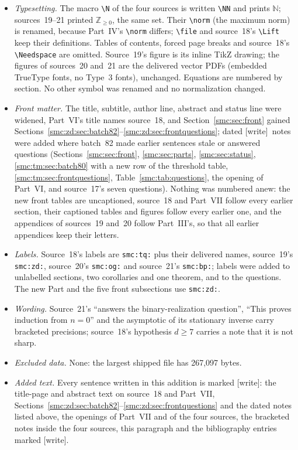 \documentclass[11pt,letterpaper]{article}
\numberwithin{equation}{section}
\theoremstyle{definition}
\theoremstyle{remark}
\newcommand{\N}{\mathbb N_0}
\newcommand{\NN}{\mathbb N}
\newcommand{\wtag}{\textup{[write]}}
\newcommand{\norm}[1]{\mathcal N(#1)}
\newcommand{\Lift}{\mathcal L}\newcommand{\inorm}[1]{\lVert#1\rVert_\infty}
\newcommand{\file}[1]{\texttt{\detokenize{#1}}}
\begin{document}
\begin{itemize}
\item \emph{Typesetting.} The macro \verb|\N| of the four sources is written \verb|\NN| and prints $\NN$; sources~19--21 printed $\mathbb Z_{\ge0}$, the same set. Their \verb|\norm| (the maximum norm) is renamed, because Part~IV's \verb|\norm| differs; \verb|\file| and source~18's \verb|\Lift| keep their definitions. Tables of contents, forced page breaks and source~18's \verb|\Needspace| are omitted. Source~19's figure is its inline TikZ drawing; the figures of sources~20 and~21 are the delivered vector PDFs (embedded TrueType fonts, no Type~3 fonts), unchanged. Equations are numbered by section. No other symbol was renamed and no normalization changed.
\item \emph{Front matter.} The title, subtitle, author line, abstract and status line were widened, Part~VI's title names source~18, and Section~\ref{smc:sec:front} gained Sections~\ref{smc:zd:sec:batch82}--\ref{smc:zd:sec:frontquestions}; dated \wtag\ notes were added where batch~82 made earlier sentences stale or answered questions (Sections~\ref{smc:sec:front}, \ref{smc:sec:parts}, \ref{smc:sec:status}, \ref{smc:tm:sec:batch80} with a new row of the threshold table, \ref{smc:tm:sec:frontquestions}, Table~\ref{smc:tab:questions}, the opening of Part~VI, and source~17's seven questions). Nothing was numbered anew: the new front tables are uncaptioned, source~18 and Part~VII follow every earlier section, their captioned tables and figures follow every earlier one, and the appendices of sources~19 and~20 follow Part~III's, so that all earlier appendices keep their letters.
\item \emph{Labels.} Source~18's labels are \texttt{smc:tq:} plus their delivered names, source~19's \texttt{smc:zd:}, source~20's \texttt{smc:og:} and source~21's \texttt{smc:bp:}; labels were added to unlabelled sections, two corollaries and one theorem, and to the questions. The new Part and the five front subsections use \texttt{smc:zd:}.
\item \emph{Wording.} Source~21's ``answers the binary-realization question'', ``This proves induction from $n=0$'' and the asymptotic of its stationary inverse carry bracketed precisions; source~18's hypothesis $d\ge7$ carries a note that it is not sharp.
\item \emph{Excluded data.} None: the largest shipped file has 267,097 bytes.
\item \emph{Added text.} Every sentence written in this addition is marked \wtag: the title-page and abstract text on source~18 and Part~VII, Sections~\ref{smc:zd:sec:batch82}--\ref{smc:zd:sec:frontquestions} and the dated notes listed above, the openings of Part~VII and of the four sources, the bracketed notes inside the four sources, this paragraph and the bibliography entries marked \wtag.
\end{itemize}
\end{document}
